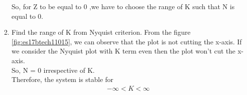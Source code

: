 \begin{enumerate}[label=\thesection.\arabic*.,ref=\thesection.\theenumi]
So, for Z to be equal to 0 ,we have to choose the range of K such that N is equal to 0.
\\
\item Find the range of K from Nyquist criterion.
\solution From the figure \ref{fig:es17btech11015}, we can observe that the plot is not cutting the x-axis. If we consider the Nyquist plot with K term even then the plot won't cut the x-axis. 
\\
So, N = 0 irrespective of K. 
\\
Therefore, the system is stable for 
\begin{align}
    -\infty < K < \infty
\end{align}

\end{enumerate}
